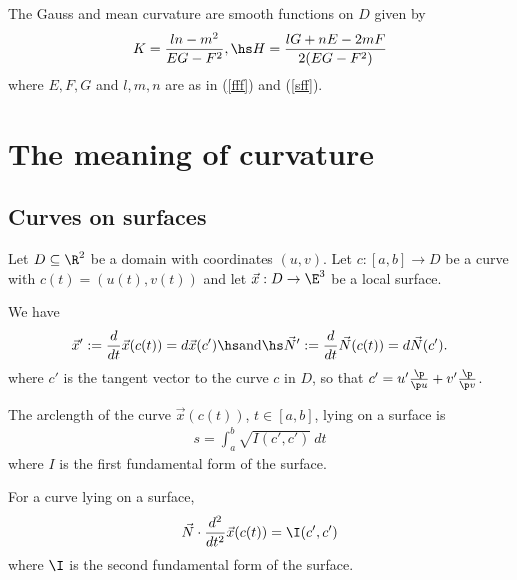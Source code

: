 \documentclass{article}
\begin{document}
\begin{proposition}[Notes 8.5]
    The Gauss and mean curvature are smooth functions on $D$ given by
    \begin{align*}
        K=\frac{ln-m^2}{EG-F^2},\hs
        H=\frac{lG+nE-2mF}{2(EG-F^2)}
    \end{align*}
    where $E,F,G$ and $l,m,n$ are as in (\ref{fff}) and (\ref{sff}).
\end{proposition}

\section{The meaning of curvature}

\subsection{Curves on surfaces}

Let $D\subseteq\R^2$ be a domain with coordinates $(u,v)$.
Let $c:[a,b]\to D$ be a curve with $c(t)=(u(t),v(t))$ and let $\vec x: D\to\E^3$ be a
local surface.

\begin{lemma}[Notes 9.1]
    We have
    \begin{align*}
        \vec x' := \frac{d}{dt}\vec x(c(t)) = d\vec x(c')\hs\text{and}\hs
        \vec N' := \frac{d}{dt}\vec N(c(t)) = d\vec N(c').
    \end{align*}
    where $c'$ is the tangent vector to the curve $c$ in $D$, so that
    $c'=u'\frac{\p }{\p u}+v'\frac{\p }{\p v}$.
\end{lemma}

\begin{proposition}[Notes 9.2]
    The arclength of the curve $\vec x(c(t))$, $t\in[a,b]$, lying on a surface is
    \begin{align*}
        s = \int_a^b \sqrt{I(c',c')}\:dt
    \end{align*}
    where $I$ is the first fundamental form of the surface.
\end{proposition}

\begin{proposition}[Notes 9.5]
    For a curve lying on a surface,
    \begin{align*}
        \vec N\cdot \frac{d^2}{dt^2}\vec x(c(t)) = \I(c',c')
    \end{align*}
    where $\I$ is the second fundamental form of the surface.
\end{proposition}
\end{document}
